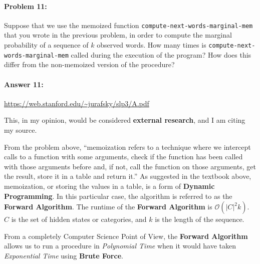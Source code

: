 \documentclass[12pt, letterpaper]{article}
\begin{document}
\hrulefill
\paragraph{Problem 11:}
Suppose that we use the memoized function
\texttt{compute-next-words-marginal-mem} that you wrote in the
previous problem, in order to compute the marginal probability of a
sequence of $k$ observed words. How many times is
\texttt{compute-next-words-marginal-mem} called during the execution
of the program? How does this differ from the non-memoized version of
the procedure?


\paragraph{Answer 11:} \url{https://web.stanford.edu/~jurafsky/slp3/A.pdf}

This, in my opinion, would be considered \textbf{external research}, and I am citing my source.

From the problem above, ``memoization refers to a technique where we intercept calls to a function with some arguments, check if the function has been called with those arguments before and, if not, call the function on those arguments, get the result, store it in a table and return it.'' As suggested in the textbook above, memoization, or storing the values in a table, is a form of \textbf{Dynamic Programming}. In this particular case, the algorithm is referred to as the \textbf{Forward Algorithm}. The runtime of the \textbf{Forward Algorithm} is $\mathcal{O}(|C|^2k)$. $C$ is the set of hidden states or categories, and $k$ is the length of the sequence.

From a completely Computer Science Point of View, the \textbf{Forward Algorithm} allows us to run a procedure in \textit{Polynomial Time} when it would have taken \textit{Exponential Time} using \textbf{Brute Force}.
\end{document}
